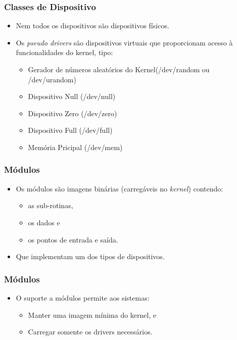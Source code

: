 \begin{frame}
	\frametitle{Classes de Dispositivo}
	\begin{itemize}
		\item<1-> Nem todos os dispositivos são dispositivos físicos.
		\item<2-> Os \textit{pseudo drivers} são dispositivos virtuais que proporcionam acesso à funcionalidades do kernel, tipo:
		\begin{itemize}
			\item<3-> Gerador de números aleatórios do Kernel(/dev/random ou /dev/urandom)
			\item<4-> Dispositivo Null (/dev/null)
			\item<5-> Dispositivo Zero (/dev/zero)
			\item<6-> Dispositivo Full (/dev/full)
			\item<7-> Memória Pricipal (/dev/mem)
		\end{itemize}
	\end{itemize}
\end{frame}

\begin{frame}
	\frametitle{Módulos}
	\begin{itemize}
		\item<1-> Os módulos são imagens binárias (carregáveis no \textit{kernel}) contendo:
		\begin{itemize}
			\item<2-> as sub-rotinas, 
			\item<3-> os dados e 
			\item<4-> os pontos de entrada e saída.
		\end{itemize}
		\item<5-> Que implementam um dos tipos de dispositivos.
	\end{itemize}
\end{frame}


\begin{frame}
	\frametitle{Módulos}
	\begin{itemize}
		\item<1-> O suporte a módulos permite aos sistemas:
		\begin{itemize}
			\item<2-> Manter uma imagem mínima do kernel, e
			\item<3-> Carregar somente os drivers necessários.
		\end{itemize}
	\end{itemize}
\end{frame}

